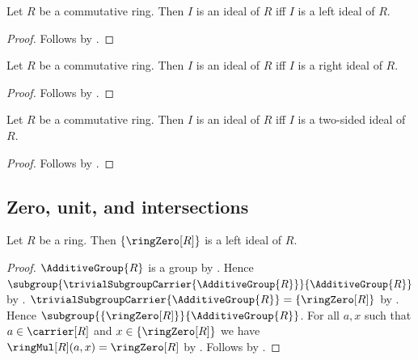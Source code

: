 \begin{theorem}\label{commutative_ideal_iff_left_ideal}
    Let $R$ be a commutative ring.
    Then $I$ is an ideal of $R$ iff $I$ is a left ideal of $R$.
\end{theorem}
\begin{proof}
    Follows by
        .
\end{proof}

\begin{corollary}\label{commutative_ideal_iff_right_ideal}
    Let $R$ be a commutative ring.
    Then $I$ is an ideal of $R$ iff $I$ is a right ideal of $R$.
\end{corollary}
\begin{proof}
    Follows by
        .
\end{proof}

\begin{corollary}\label{commutative_ideal_iff_two_sided_ideal}
    Let $R$ be a commutative ring.
    Then $I$ is an ideal of $R$ iff $I$ is a two-sided ideal of $R$.
\end{corollary}
\begin{proof}
    Follows by .
\end{proof}

\subsection{Zero, unit, and intersections}

\begin{theorem}\label{zero_is_left_ideal}
    Let $R$ be a ring.
    Then $\{\ringZero[R]\}$ is a left ideal of $R$.
\end{theorem}
\begin{proof}
    $\AdditiveGroup{R}$ is a group by
        .
    Hence $\subgroup{
        \trivialSubgroupCarrier{\AdditiveGroup{R}}}{\AdditiveGroup{R}}$ by
        .
    $\trivialSubgroupCarrier{\AdditiveGroup{R}}=\{\ringZero[R]\}$ by
        .
    Hence $\subgroup{\{\ringZero[R]\}}{\AdditiveGroup{R}}$.
    For all $a,x$ such that $a\in\carrier[R]$ and
        $x\in\{\ringZero[R]\}$ we have
        $\ringMul[R](a,x)=\ringZero[R]$ by
        .
    Follows by .
\end{proof}


